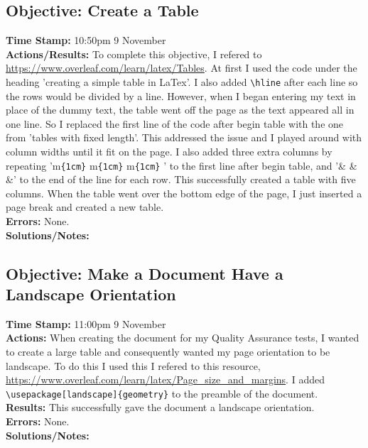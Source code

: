 \documentclass{article}
\begin{document}
\begin{FlushLeft}
\subsection{Objective: Create a Table}
\textbf{Time Stamp:} 10:50pm 9 November\\
\textbf{Actions/Results:} To complete this objective, I refered to \url{https://www.overleaf.com/learn/latex/Tables}. At first I used the code under the heading 'creating a simple table in LaTex'. I also added \verb|\hline| after each line so the rows would be divided by a line. However, when I began entering my text in place of the dummy text, the table went off the page as the text appeared all in one line. So I replaced the first line of the code after begin table with the one from 'tables with fixed length'. This addressed the issue and I played around with column widths until it fit on the page. I also added three extra columns by repeating 'm\verb|{1cm}| \textbar{} m\verb|{1cm}| \textbar{} m\verb|{1cm}| \textbar{}' to the first line after begin table, and '\& \& \&' to the end of the line for each row. This successfully created a table with five columns. When the table went over the bottom edge of the page, I just inserted a page break and created a new table.\\
\textbf{Errors:} None.\\
\textbf{Solutions/Notes:} 

\subsection{Objective: Make a Document Have a Landscape Orientation}
\textbf{Time Stamp:} 11:00pm 9 November\\
\textbf{Actions:} When creating the document for my Quality Assurance tests, I wanted to create a large table and consequently wanted my page orientation to be landscape. To do this I used this I refered to this resource, \url{https://www.overleaf.com/learn/latex/Page_size_and_margins}. I added \\\verb|\usepackage[landscape]{geometry}| to the preamble of the document. \\
\textbf{Results:} This successfully gave the document a landscape orientation.\\
\textbf{Errors:} None.\\
\textbf{Solutions/Notes:} 


\end{FlushLeft}
\end{document}

